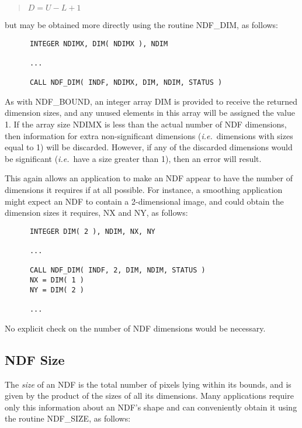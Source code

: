 \documentclass[twoside,11pt]{article}
\newcommand{\htmlref}[2]{#1}
\newcommand{\xlabel}[1]{}
\newcommand{\st}[1]{{\em{#1}}}
\begin{document}
\small
\begin{quote}
\begin{center}
$D = U - L + 1$
\end{center}
\end{quote}
\normalsize

but may be obtained more directly using the routine \htmlref{NDF\_DIM}{NDF_DIM}, as follows: 

\small
\begin{verbatim}
      INTEGER NDIMX, DIM( NDIMX ), NDIM

      ...

      CALL NDF_DIM( INDF, NDIMX, DIM, NDIM, STATUS )
\end{verbatim}
\normalsize

As with \htmlref{NDF\_BOUND}{NDF_BOUND}, an integer array DIM is provided to receive the returned
dimension sizes, and any unused elements in this array will be assigned the
value 1. 
If the array size NDIMX is less than the actual number of NDF dimensions, then
information for extra non-significant dimensions (\st{i.e.}\ dimensions with
sizes equal to 1) will be discarded.
However, if any of the discarded dimensions would be significant
(\st{i.e.}\ have a size greater than 1), then an error will result.

This again allows an application to make an NDF appear to have the number 
of dimensions it requires if at all possible.
For instance, a smoothing application might expect an NDF to contain a
2-dimensional image, and could obtain the dimension sizes it requires, NX
and NY, as follows: 

\small
\begin{verbatim}
      INTEGER DIM( 2 ), NDIM, NX, NY

      ...

      CALL NDF_DIM( INDF, 2, DIM, NDIM, STATUS )
      NX = DIM( 1 )
      NY = DIM( 2 )

      ...
\end{verbatim}
\normalsize

No explicit check on the number of NDF dimensions would be necessary. 

\subsection{\xlabel{ndf_size}NDF Size}

The \st{size\/} of an NDF is the total number of pixels lying within its
bounds, and is given by the product of the sizes of all its dimensions. 
Many applications require only this information about an NDF's  shape and can
conveniently obtain it using the routine \htmlref{NDF\_SIZE}{NDF_SIZE}, as  follows:
\end{document}
